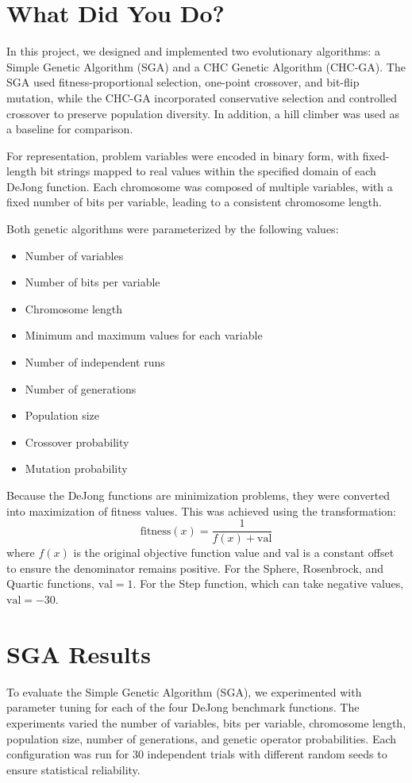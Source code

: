 \documentclass[11pt]{article}
\begin{document}
\section{What Did You Do?}
\label{section-methodology}
In this project, we designed and implemented two evolutionary algorithms: a Simple Genetic Algorithm (SGA) and a CHC Genetic Algorithm (CHC-GA). The SGA used fitness-proportional selection, one-point crossover, and bit-flip mutation, while the CHC-GA incorporated conservative selection and controlled crossover to preserve population diversity. In addition, a hill climber was used as a baseline for comparison.  

For representation, problem variables were encoded in binary form, with fixed-length bit strings mapped to real values within the specified domain of each DeJong function. Each chromosome was composed of multiple variables, with a fixed number of bits per variable, leading to a consistent chromosome length.  

Both genetic algorithms were parameterized by the following values:
\begin{itemize}
    \item Number of variables
    \item Number of bits per variable
    \item Chromosome length
    \item Minimum and maximum values for each variable
    \item Number of independent runs
    \item Number of generations
    \item Population size
    \item Crossover probability
    \item Mutation probability
\end{itemize}

Because the DeJong functions are minimization problems, they were converted into maximization of fitness values. This was achieved using the transformation:  
\[
\text{fitness}(x) = \frac{1}{f(x) + \text{val}}
\]
where \(f(x)\) is the original objective function value and \(\text{val}\) is a constant offset to ensure the denominator remains positive. For the Sphere, Rosenbrock, and Quartic functions, \(\text{val} = 1\). For the Step function, which can take negative values, \(\text{val} = -30\).

\section{SGA Results}
\label{section-sga-results}
To evaluate the Simple Genetic Algorithm (SGA), we experimented with parameter tuning for each of the four DeJong benchmark functions. The experiments varied the number of variables, bits per variable, chromosome length, population size, number of generations, and genetic operator probabilities. Each configuration was run for 30 independent trials with different random seeds to ensure statistical reliability.  
\end{document}
